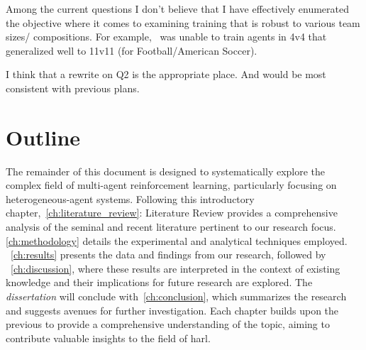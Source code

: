 \begin{comment}
    
\end{comment}

\begin{tcolorbox}[colback=blue!5,colframe=blue!50!black,title=Note to Editor]
    Among the current questions I don't believe that I have effectively enumerated the
    objective where it comes to examining training that is robust to various team sizes/
    compositions. For example,~\cite{smit2023} was unable to train agents in 4v4 that generalized
    well to 11v11 (for Football/American Soccer).

    I think that a rewrite on Q2 is the appropriate place. 
    And would be most consistent with previous plans.
\end{tcolorbox}

\section{Outline}

The remainder of this document is designed to systematically explore the complex field of 
multi-agent reinforcement learning, particularly focusing on heterogeneous-agent systems.
Following this introductory chapter,~\ref{ch:literature_review}: Literature Review provides a 
comprehensive analysis of the seminal and recent literature pertinent to our research focus.%
\ref{ch:methodology} details the experimental and analytical techniques employed.
~\ref{ch:results} presents the data and findings from our research, followed by 
~\ref{ch:discussion}, where these results are interpreted in the context of existing 
knowledge and their implications for future research are explored.
The \emph{dissertation} will conclude with~\ref{ch:conclusion}, 
which summarizes the research and suggests avenues for further investigation. 
Each chapter builds upon the previous to provide a comprehensive understanding of the topic, 
aiming to contribute valuable insights to the field of \gls{harl}.

